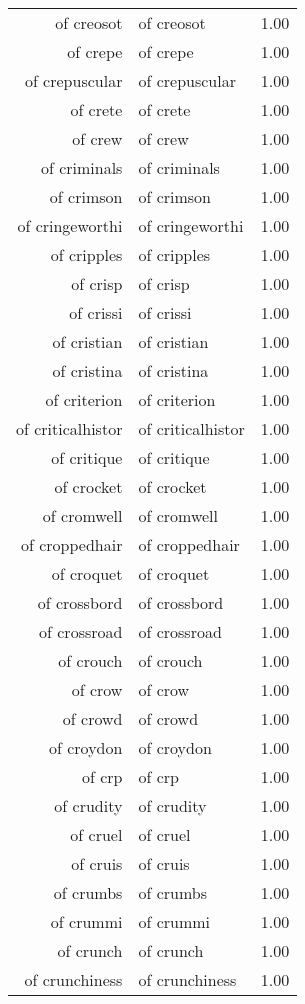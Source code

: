 \begin{table}[ht]
\begin{tabular}{rlr}
  of creosot & of creosot & 1.00 \\ 
  of crepe & of crepe & 1.00 \\ 
  of crepuscular & of crepuscular & 1.00 \\ 
  of crete & of crete & 1.00 \\ 
  of crew & of crew & 1.00 \\ 
  of criminals & of criminals & 1.00 \\ 
  of crimson & of crimson & 1.00 \\ 
  of cringeworthi & of cringeworthi & 1.00 \\ 
  of cripples & of cripples & 1.00 \\ 
  of crisp & of crisp & 1.00 \\ 
  of crissi & of crissi & 1.00 \\ 
  of cristian & of cristian & 1.00 \\ 
  of cristina & of cristina & 1.00 \\ 
  of criterion & of criterion & 1.00 \\ 
  of criticalhistor & of criticalhistor & 1.00 \\ 
  of critique & of critique & 1.00 \\ 
  of crocket & of crocket & 1.00 \\ 
  of cromwell & of cromwell & 1.00 \\ 
  of croppedhair & of croppedhair & 1.00 \\ 
  of croquet & of croquet & 1.00 \\ 
  of crossbord & of crossbord & 1.00 \\ 
  of crossroad & of crossroad & 1.00 \\ 
  of crouch & of crouch & 1.00 \\ 
  of crow & of crow & 1.00 \\ 
  of crowd & of crowd & 1.00 \\ 
  of croydon & of croydon & 1.00 \\ 
  of crp & of crp & 1.00 \\ 
  of crudity & of crudity & 1.00 \\ 
  of cruel & of cruel & 1.00 \\ 
  of cruis & of cruis & 1.00 \\ 
  of crumbs & of crumbs & 1.00 \\ 
  of crummi & of crummi & 1.00 \\ 
  of crunch & of crunch & 1.00 \\ 
  of crunchiness & of crunchiness & 1.00 \\ 

\end{tabular}
\end{table}
